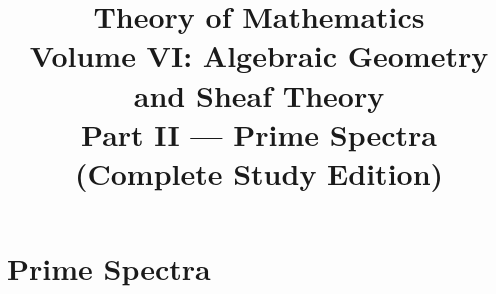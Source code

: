 \documentclass[11pt,a4paper,oneside,openany]{book}
\title{Theory of Mathematics\\[0.5em]\Large Volume VI: Algebraic Geometry and Sheaf Theory\\[0.4em]\normalsize Part II --- Prime Spectra (Complete Study Edition)}
\author{}\date{}
\begin{document}
\maketitle\clearpage
\frontmatter\tableofcontents
\mainmatter
\part{Prime Spectra}






\end{document}
